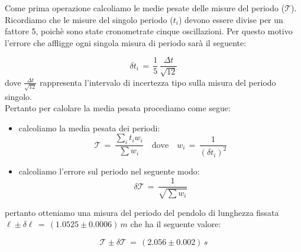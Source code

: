 Come prima operazione calcoliamo le medie pesate delle misure del periodo ($\mathcal{T}$). Ricordiamo che le misure del singolo periodo ($t_i$) devono essere divise per un fattore 5, poichè sono state cronometrate cinque oscillazioni. Per questo motivo l'errore che affligge ogni singola misura di periodo sarà il seguente:

\begin{equation*}
	\delta t_i \,=\, \frac{1}{5} \, \frac{\Delta t}{\sqrt{12}}
\end{equation*}
%
dove $\frac{\Delta t}{\sqrt{12}}$ rappresenta l'intervalo di incertezza tipo sulla misura del periodo singolo.\\
Pertanto per calolare la media pesata procediamo come segue:
\begin{itemize}
	\item{calcoliamo la media pesata dei periodi:
			\begin{equation*}
				\mathcal{T} \,=\, \frac{\sum_i t_i w_i}{\sum w_i} \quad \text{dove} \quad w_i \,=\, \frac{1}{(\delta t_i)^2}
			\end{equation*}
			}
	\item{calcoliamo l'errore sul periodo nel seguente modo:
			\begin{equation*}
				\delta \mathcal{T} \,=\, \frac{1}{\sqrt{\sum w_i}}
			\end{equation*}
			}
\end{itemize}
pertanto otteniamo una misura del periodo del pendolo di lunghezza fissata $\ell \pm \delta \ell \,=\, (1.0525 \pm 0.0006) \, m$ che ha il seguente valore:

\begin{equation*}
	\mathcal{T} \pm \delta \mathcal{T} \,=\, (2.056 \pm 0.002) \, s
\end{equation*}
%







